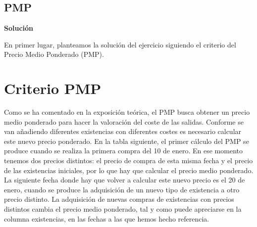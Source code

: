 \documentclass{article}
\begin{document}
\subsection*{PMP}
\textbf{Solución}

En primer lugar, planteamos la solución del ejercicio siguiendo el criterio del Precio Medio Ponderado (PMP).

\section*{Criterio PMP}

Como se ha comentado en la exposición teórica, el PMP busca obtener un precio medio ponderado para hacer la valoración del coste de las salidas. Conforme se van añadiendo diferentes existencias con diferentes costes es necesario calcular este nuevo precio ponderado. En la tabla siguiente, el primer cálculo del PMP se produce cuando se realiza la primera compra del 10 de enero. En ese momento tenemos dos precios distintos: el precio de compra de esta misma fecha y el precio de las existencias iniciales, por lo que hay que calcular el precio medio ponderado. La siguiente fecha donde hay que volver a calcular este nuevo precio es el 20 de enero, cuando se produce la adquisición de un nuevo tipo de existencia a otro precio distinto. La adquisición de nuevas compras de existencias con precios distintos cambia el precio medio ponderado, tal y como puede apreciarse en la columna existencias, en las fechas a las que hemos hecho referencia.
\end{document}
